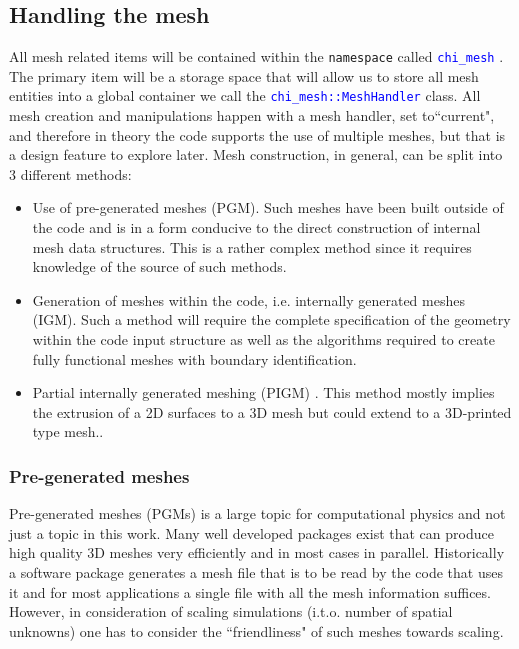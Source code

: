 \documentclass[11pt,letterpaper,titlepage]{article}
\newcommand{\xmltag}[1]{\textcolor{blue}{ \texttt{#1}} }
\newcommand{\xmloption}[1]{\textcolor{ao(english)}{ \texttt{#1}} }
\numberwithin{equation}{section}
\begin{document}
\subsection{Handling the mesh}
All mesh related items will be contained within the \xmloption{namespace} called \xmltag{chi\_mesh}. The primary item will be a storage space that will allow us to store all mesh entities into a global container we call the \xmltag{chi\_mesh::MeshHandler} class. All mesh creation and manipulations happen with a mesh handler, set to``current", and therefore in theory the code supports the use of multiple meshes, but that is a design feature to explore later.
\newline
\newline
Mesh construction, in general, can be split into 3 different methods:
\begin{itemize}
\item Use of pre-generated meshes (PGM). Such meshes have been built outside of the code and is in a form conducive to the direct construction of internal mesh data structures. This is a rather complex method since it requires knowledge of the source of such methods.
\item Generation of meshes within the code, i.e. internally generated meshes (IGM). Such a method will require the complete specification of the geometry within the code input structure as well as the algorithms required to create fully functional meshes with boundary identification.
\item Partial internally generated meshing (PIGM) . This method mostly implies the extrusion of a 2D surfaces to a 3D mesh but could extend to a 3D-printed type mesh..
\end{itemize}


\subsubsection{Pre-generated meshes}
Pre-generated meshes (PGMs) is a large topic for computational physics and not just a topic in this work. Many well developed packages exist that can produce high quality 3D meshes very efficiently and in most cases in parallel. Historically a software package generates a mesh file that is to be read by the code that uses it and for most applications a single file with all the mesh information suffices. However, in consideration of scaling simulations (i.t.o. number of spatial unknowns) one has to consider the ``friendliness" of such meshes towards scaling. 
\end{document}
